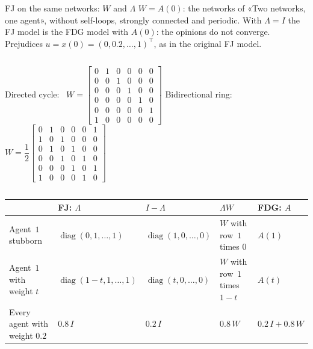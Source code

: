 \documentclass[10pt, aspectratio=169]{beamer}
\begin{document}
\begin{frame}[label=m-fj-matrices]{FJ on the same networks: $W$ and $\Lambda$}
  \footnotesize
  $W = A(0)$: the networks of «Two networks, one agent», without self-loops, strongly
  connected and periodic. With $\Lambda = I$ the FJ model is the FDG model with $A(0)$: the
  opinions do not converge. Prejudices $u = x(0) = (0, 0.2, \dots, 1)^\top$, as in the
  original FJ model.

  {\setlength{\arraycolsep}{3.5pt}\renewcommand{\arraystretch}{0.8}%
  \begin{columns}[c]
      \centering
      Directed cycle: \
      $W = \begin{bmatrix}
        0&1&0&0&0&0\\ 0&0&1&0&0&0\\ 0&0&0&1&0&0\\ 0&0&0&0&1&0\\ 0&0&0&0&0&1\\ 1&0&0&0&0&0
      \end{bmatrix}$
      \centering
      Bidirectional ring: \
      $W = \dfrac12 \begin{bmatrix}
        0&1&0&0&0&1\\ 1&0&1&0&0&0\\ 0&1&0&1&0&0\\ 0&0&1&0&1&0\\ 0&0&0&1&0&1\\ 1&0&0&0&1&0
      \end{bmatrix}$
  \end{columns}}

  \smallskip
  \scriptsize
  \renewcommand{\arraystretch}{1.1}
  \begin{tabular}{@{}lllll@{}}
    \toprule
    & \textbf{FJ}: $\Lambda$ & $I - \Lambda$ & $\Lambda W$ & \textbf{FDG}: $A$ \\
    \midrule
    Agent~$1$ stubborn & $\operatorname{diag}(0, 1, \dots, 1)$
      & $\operatorname{diag}(1, 0, \dots, 0)$ & $W$ with row~$1$ times $0$ & $A(1)$ \\
    Agent~$1$ with weight $t$ & $\operatorname{diag}(1-t, 1, \dots, 1)$
      & $\operatorname{diag}(t, 0, \dots, 0)$ & $W$ with row~$1$ times $1-t$ & $A(t)$ \\
    Every agent with weight $0.2$ & $0.8\,I$ & $0.2\,I$ & $0.8\,W$ & $0.2\,I + 0.8\,W$ \\
    \bottomrule
  \end{tabular}


\end{frame}
\end{document}
